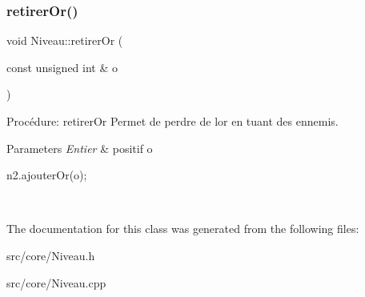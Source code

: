 \subsubsection{\texorpdfstring{retirer\+Or()}{retirerOr()}}
{\footnotesize\ttfamily void Niveau\+::retirer\+Or (\begin{DoxyParamCaption}\item[{const unsigned int \&}]{o }\end{DoxyParamCaption})}



Procédure\+: retirer\+Or Permet de perdre de l\textquotesingle{}or en tuant des ennemis. 


\begin{DoxyParams}{Parameters}
{\em Entier} & positif o 
\begin{DoxyCode}
n2.ajouterOr(o);
\end{DoxyCode}
 \\
\hline
\end{DoxyParams}


The documentation for this class was generated from the following files\+:\begin{DoxyCompactItemize}
\item 
src/core/Niveau.\+h\item 
src/core/Niveau.\+cpp\end{DoxyCompactItemize}
